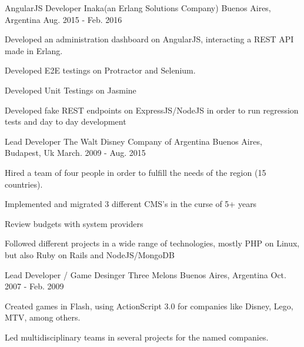 \begin{cventries}
    \cventry
    {AngularJS Developer} %
    {Inaka(an Erlang Solutions Company)} %
    {Buenos Aires, Argentina} %
    {Aug. 2015 - Feb. 2016} %
    {
    \begin{cvitems} %
        \item {Developed an administration dashboard on AngularJS, interacting a REST API made in Erlang.}
        \item {Developed E2E testings on Protractor and Selenium.}
        \item {Developed Unit Testings on Jasmine}
        \item {Developed fake REST endpoints on ExpressJS/NodeJS in order to run regression tests and day to day development}
    \end{cvitems}
    }
    \cventry
    {Lead Developer} %
    {The Walt Disney Company of Argentina} %
    {Buenos Aires, Budapest, Uk} %
    {March. 2009 - Aug. 2015} %
    {
    \begin{cvitems} %
        \item {Hired a team of four people in order to fulfill the needs of the region (15 countries).}
        \item {Implemented and migrated 3 different CMS's in the curse of 5+ years}
        \item {Review budgets with system providers}
        \item {Followed different projects in a wide range of technologies, mostly PHP on Linux, but also Ruby on Rails and NodeJS/MongoDB}
    \end{cvitems}
    }

    \cventry
    {Lead Developer / Game Desinger} %
    {Three Melons} %
    {Buenos Aires, Argentina} %
    {Oct. 2007 - Feb. 2009} %
    {
    \begin{cvitems} %
        \item {Created games in Flash, using ActionScript 3.0 for companies like Disney, Lego, MTV, among others.}
        \item {Led multidisciplinary teams in several projects for the named companies.}
    \end{cvitems}
    }


\end{cventries}
